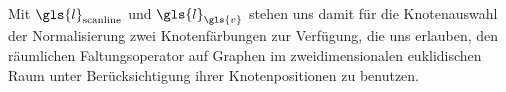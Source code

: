 Mit $\gls{l}_{\mathrm{scanline}}$ und $\gls{l}_{\gls{v}}$ stehen uns damit für die Knotenauswahl \bzw{} der Normalisierung zwei Knotenfärbungen zur Verfügung, die uns erlauben, den räumlichen Faltungsoperator auf Graphen im zweidimensionalen euklidischen Raum unter Berücksichtigung ihrer Knotenpositionen zu benutzen.
